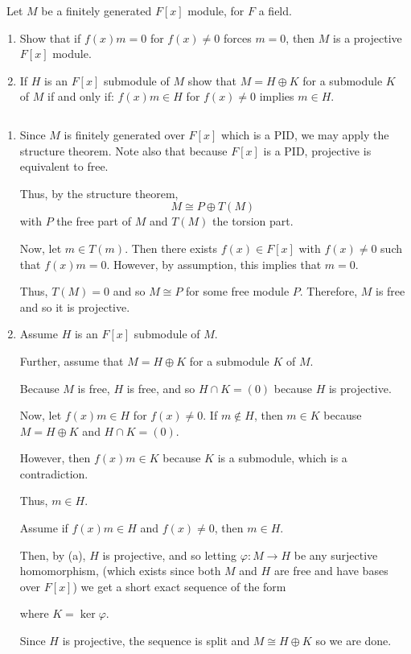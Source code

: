 \documentclass[12pt]{Qual}
\begin{document}
\begin{problem} $\,$
Let $M$ be a finitely generated $F[x]$ module, for $F$ a field.
\begin{enumerate}[label=(\alph*)]
    \item Show that if $f(x)m=0$ for $f(x)\not=0$ forces $m=0$, then $M$ is a projective $F[x]$ module.
    \item If $H$ is an $F[x]$ submodule of $M$ show that $M=H\oplus K$ for a submodule $K$ of $M$ if and only if: $f(x)m\in H$ for $f(x)\not=0$ implies $m\in H.$
\end{enumerate}
\end{problem}


\begin{solution}$\,$
\begin{enumerate}[label=(\alph*)]
    \item Since $M$ is finitely generated over $F[x]$ which is a PID, we may apply the structure theorem. Note also that because $F[x]$ is a PID, projective is equivalent to free.

    Thus, by the structure theorem, $$M\cong P\oplus T(M)$$ with $P$ the free part of $M$ and $T(M)$ the torsion part.

    Now, let $m\in T(m)$. Then there exists $f(x)\in F[x]$ with $f(x)\not=0$ such that $f(x)m=0$. However, by assumption, this implies that $m=0$.

    Thus, $T(M)=0$ and so $M\cong P$ for some free module $P$. Therefore, $M$ is free and so it is projective.

    \item \boxed{\implies} Assume $H$ is an $F[x]$ submodule of $M$.

    Further, assume that $M=H\oplus K$ for a submodule $K$ of $M$.

    Because $M$ is free, $H$ is free, and so $H\cap K=(0)$ because $H$ is projective.

    Now, let $f(x)m\in H$ for $f(x)\not=0$. If $m\notin H$, then $m\in K$ because $M=H\oplus K$ and $H\cap K=(0)$.

    However, then $f(x)m\in K$ because $K$ is a submodule, which is a contradiction.

    Thus, $m\in H$.

    \boxed{\impliedby} Assume if $f(x)m\in H$ and $f(x)\not=0$, then $m\in H$.

    Then, by (a), $H$ is projective, and so letting $\varphi:M\to H$ be any surjective homomorphism, (which exists since both $M$ and $H$ are free and have bases over $F[x]$) we get a short exact sequence of the form
    \begin{center}
    \end{center} where $K=\ker\varphi$.

    Since $H$ is projective, the sequence is split and $M\cong H\oplus K$ so we are done.
\end{enumerate}
\end{solution}
\newpage
\end{document}
